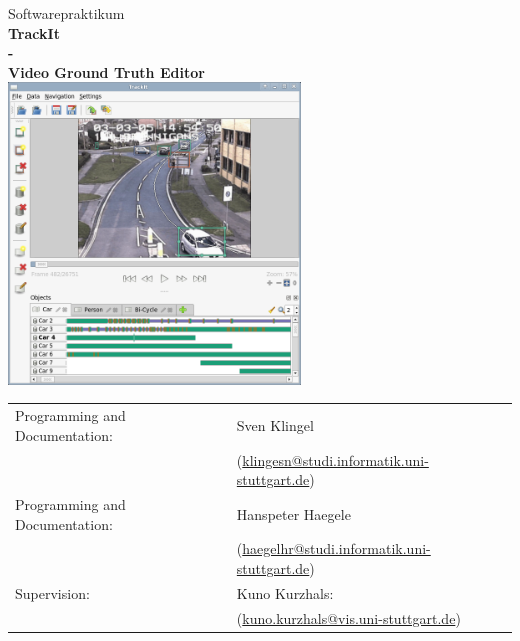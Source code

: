 \begin{center}
\begin{figure}[t]
\begin{minipage}[t]{6cm}
    \end{minipage}
\end{figure}
\begin{minipage}{13cm}
\begin{center}
\vspace*{8ex}
\large
Softwarepraktikum\\
\vspace*{1cm}
\Huge
\textbf{TrackIt\\ \vspace*{-1mm} - \\ \vspace*{-1mm} \large Video Ground Truth Editor}\\
\vspace*{1cm}
\normalsize
\includegraphics[height=8cm]{images/Titelbild}
\end{center}
\vspace{1cm}
\renewcommand{\arraystretch}{1.6}
\enlargethispage{1.5cm}
\begin{tabular}{ll}
Programming and Documentation: &Sven Klingel\\ & (\href{mailto:klingesn@studi.informatik.uni-stuttgart.de}{klingesn@studi.informatik.uni-stuttgart.de})\\
Programming and Documentation: &Hanspeter Haegele\\& (\href{mailto:haegelhr@studi.informatik.uni-stuttgart.de}{haegelhr@studi.informatik.uni-stuttgart.de})\\
Supervision:                     &Kuno Kurzhals:\\& (\href{mailto:kuno.kurzhals@vis.uni-stuttgart.de}{kuno.kurzhals@vis.uni-stuttgart.de})

\end{tabular}
\vspace{1ex}
\end{minipage}
\end{center}

